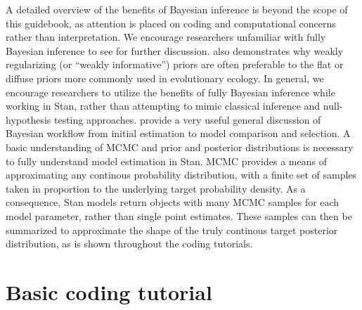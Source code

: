 \documentclass[
]{book}
\begin{document}
A detailed overview of the benefits of Bayesian inference is beyond the scope of this guidebook, as attention is placed on coding and computational concerns rather than interpretation. We encourage researchers unfamiliar with fully Bayesian inference to see \citet{Rethinking} for further discussion. \citet{Lemoine2019} also demonstrates why weakly regularizing (or ``weakly informative'') priors are often preferable to the flat or diffuse priors more commonly used in evolutionary ecology. In general, we encourage researchers to utilize the benefits of fully Bayesian inference while working in Stan, rather than attempting to mimic classical inference and null-hypothesis testing approaches. \citet{Gelman2020} provide a very useful general discussion of Bayesian workflow from initial estimation to model comparison and selection. A basic understanding of MCMC and prior and posterior distributions is necessary to fully understand model estimation in Stan. MCMC provides a means of approximating any continous probability distribution, with a finite set of samples taken in proportion to the underlying target probability density. As a consequence, Stan models return objects with many MCMC samples for each model parameter, rather than single point estimates. These samples can then be summarized to approximate the shape of the truly continous target posterior distribution, as is shown throughout the coding tutorials.

\hypertarget{basic-coding-tutorial}{%
\section{Basic coding tutorial}\label{basic-coding-tutorial}}
\end{document}
